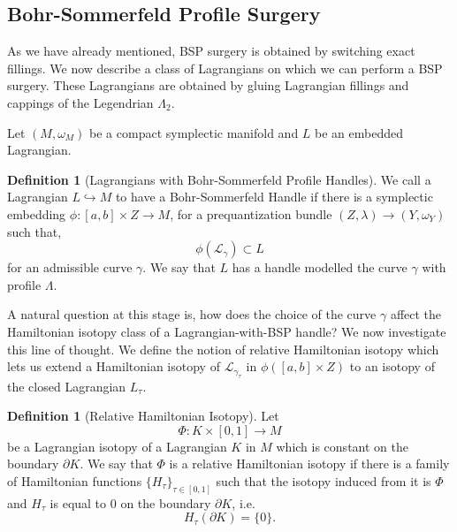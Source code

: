 \documentclass[11pt, oneside,dvipsnames]{amsart}
\renewcommand{\to}{\rightarrow}
\newcommand{\sub}{\subset}
\newcommand{\interval}{[0,1]}
\renewcommand{\to}{\rightarrow}
\newcommand{\<}{\langle}
\renewcommand{\>}{\rangle}
\newcommand{\cL}{\mathcal{L}}
\renewcommand{\to}{\rightarrow}
\theoremstyle{definition}
\theoremstyle{definition}
\newtheorem{defn}[Theorem]{Definition}
\numberwithin{equation}{subsection}
\begin{document}
\subsection{Bohr-Sommerfeld Profile Surgery}


As we have already mentioned,  BSP surgery is obtained by switching exact fillings. We now describe a class of Lagrangians on which we can perform a BSP surgery. These Lagrangians are obtained by gluing Lagrangian fillings and cappings of the Legendrian $\Lambda_2$. 

\noindent Let $(M,\omega_M)$ be a compact symplectic manifold and $L$ be an embedded Lagrangian.


\begin{defn}[Lagrangians with Bohr-Sommerfeld Profile Handles]\label{bsphandle}
    We call a Lagrangian $ L \hookrightarrow M$ to have a Bohr-Sommerfeld Handle if there is a symplectic embedding $\phi : [a,b] \times Z \to M$, for a prequantization bundle $(Z,\lambda) \to (Y,\omega_Y)$ such that,
   $$\phi (\cL_\gamma) \sub L$$for an admissible curve $\gamma$. We say that $L$ has a handle modelled the curve $\gamma$ with profile $\Lambda.$
\end{defn}

A natural question at this stage is, how does the choice of the curve $\gamma$ affect the Hamiltonian isotopy class of a Lagrangian-with-BSP handle? We now investigate this line of thought.  We define the notion of relative Hamiltonian isotopy which lets us extend a Hamiltonian isotopy of $\cL_{\gamma_\tau}$ in $\phi([a,b]\times Z)$ to an isotopy of the closed Lagrangian $L_\tau.$


\begin{defn}[Relative Hamiltonian Isotopy]
Let $$\Phi: K\times [0,1] \to M $$ be a Lagrangian isotopy of a Lagrangian $K$ in $M$ which is constant on the boundary $\partial K$. We say that $\Phi$ is a relative Hamiltonian isotopy if there is a family of Hamiltonian functions $\{H_\tau\}_{\tau \in \interval}$ such that the isotopy induced from it is $\Phi$ and $H_\tau$ is equal to $0$ on the boundary $\partial K$, i.e.$$H_\tau (\partial K) = \{ 0 \}.$$
    
\end{defn}
\end{document}
